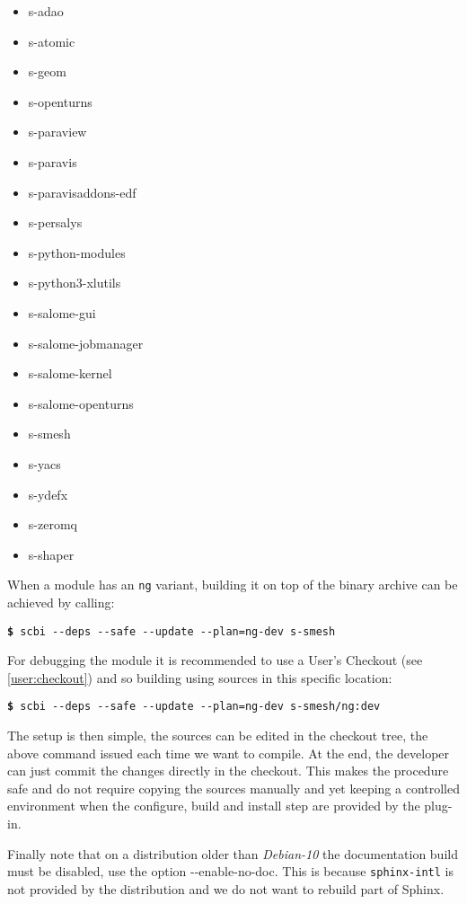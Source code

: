\documentclass[a4paper,12pt,twoside]{article}
\newcommand{\code}[1]{\texttt{#1}}
\renewcommand{\emph}[1]{\textit{#1}}
\newcommand{\cmd}[1]{\tabto{1cm}\hspace{0.5cm}\texttt{\textbf{\$} #1}}
\newcommand{\ddash}{-{}-}
\begin{document}
\begin{itemize}
	\item s-adao
	\item s-atomic
	\item s-geom
	\item s-openturns
	\item s-paraview
	\item s-paravis
	\item s-paravisaddons-edf
	\item s-persalys
	\item s-python-modules
	\item s-python3-xlutils
	\item s-salome-gui
	\item s-salome-jobmanager
	\item s-salome-kernel
	\item s-salome-openturns
	\item s-smesh
	\item s-yacs
	\item s-ydefx
	\item s-zeromq
        \item s-shaper
\end{itemize}

When a module has an \code{ng} variant, building it on top of the binary archive can be achieved by calling:

\cmd{scbi \ddash{}deps \ddash{}safe \ddash{}update \ddash{}plan=ng-dev s-smesh}

For debugging the module it is recommended to use a User's Checkout (see \ref{user:checkout}) and so building using sources in this specific location:

\cmd{scbi \ddash{}deps \ddash{}safe \ddash{}update \ddash{}plan=ng-dev s-smesh/ng:dev}

The setup is then simple, the sources can be edited in the checkout tree, the above command issued each time we want to compile. At the end, the developer can just commit the changes directly in the checkout. This makes the procedure safe and do not require copying the sources manually and yet keeping a controlled environment when the configure, build and install step are provided by the plug-in.

Finally note that on a distribution older than \emph{Debian-10} the documentation build must be disabled, use the option \ddash{}enable-no-doc. This is because \code{sphinx-intl} is not provided by the distribution and we do not want to rebuild part of Sphinx.
\end{document}
